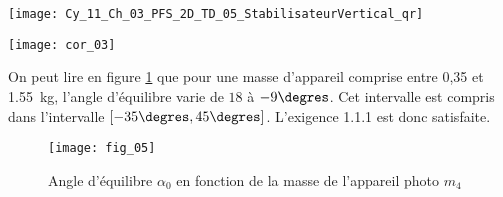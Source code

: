 \ifprof
\else
\begin{marginfigure}
\centering
\texttt{[image: Cy\_11\_Ch\_03\_PFS\_2D\_TD\_05\_StabilisateurVertical\_qr]}
\end{marginfigure}
\fi



\ifprof
\else
{}
\fi

\ifprof
\begin{marginfigure}
\texttt{[image: cor\_03]}
\end{marginfigure}
\begin{corrige} 

On peut lire en figure \ref{Cy_11_Ch_03_PFS_2D_TD_05_fig_05} que pour une masse d'appareil comprise entre 0,35 et \SI{1,55}{kg}, l'angle d'équilibre varie de $18$ à $-9\degres$. Cet intervalle est compris dans l'intervalle $\left[-35\degres,45\degres\right]$. L'exigence 1.1.1 est donc satisfaite.
\end{corrige}
\else
\fi

\ifprof
\else

\begin{figure}[!h]
\texttt{[image: fig\_05]}
\caption{Angle d’équilibre $\alpha_0$ en fonction de la masse de l’appareil photo $m_4$}
\label{Cy_11_Ch_03_PFS_2D_TD_05_fig_05}
\end{figure}

\fi

